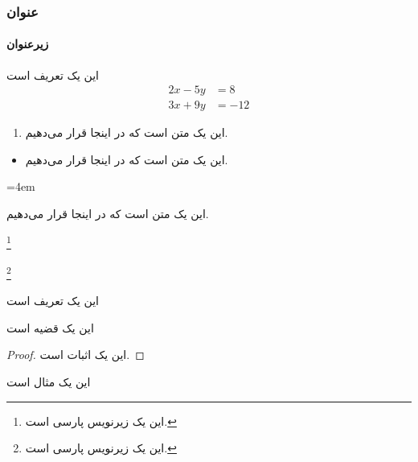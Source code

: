 \documentclass[10pt,xcolor=dvipsnames]{beamer}
\begin{document}
\begin{frame}
\frametitle{عنوان}
\framesubtitle{زیرعنوان}
\begin{definition}
این یک تعریف است 
\begin{align}
2x - 5y &=  8 \\ 
3x + 9y &=  -12
\end{align}
\end{definition}

\end{frame}
\begin{frame}
\ptext[1]
\begin{enumerate}\itemindent=2em
\item 
این یک متن است که در اینجا قرار می‌دهیم.
\end{enumerate}
\pause

\begin{itemize}\itemindent=2em
\item 
این یک متن است که در اینجا قرار می‌دهیم.
\end{itemize}

\begin{description}\itemindent=4em
\item[آزمایش]
این یک متن است که در اینجا قرار می‌دهیم.
\end{description}

\end{frame}
\begin{frame}

\footnote{این یک زیرنویس پارسی است.}%

%

%

\footnote{این یک زیرنویس پارسی است.}

\end{frame}
\begin{frame}
\ptext[1]
\begin{definition}
این یک تعریف است
\end{definition}
\pause

\begin{theorem}
این یک قضیه است
\end{theorem}
\pause

\begin{proof}
این یک اثبات است.
\end{proof}
\pause

\begin{example}
این یک مثال است
\end{example}
\end{frame}
\end{document}
